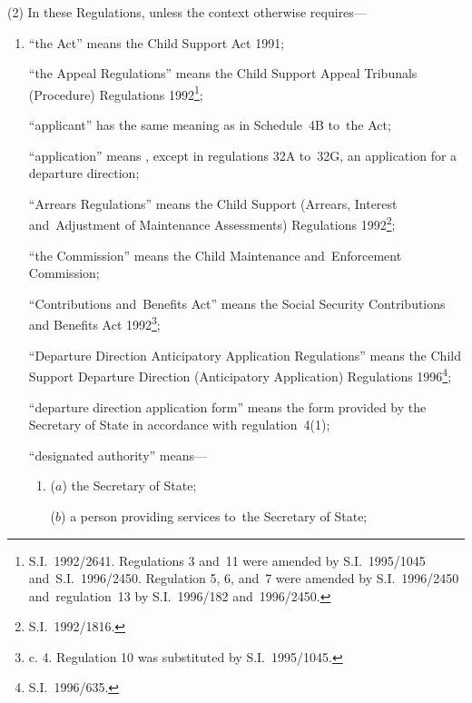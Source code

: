 \documentclass[12pt,a4paper]{article}
\begin{document}
(2) In these Regulations, unless the context otherwise requires—
\begin{enumerate}\item[]
“the Act” means the Child Support Act 1991;

“the Appeal Regulations” means the Child Support Appeal Tribunals (Procedure)
Regulations 1992\footnote{\frenchspacing S.I.~1992/2641. Regulations 3 and~11 were amended by S.I.~1995/1045 and~S.I.~1996/2450. Regulation 5, 6, and~7 were amended by S.I.~1996/2450 and~regulation~13 by S.I.~1996/182 and~1996/2450.};

“applicant” has the same meaning as in Schedule~4B to~the Act;

“application” means%
, except in regulations 32A to~32G,  %
an application for a departure direction;

“Arrears Regulations” means the Child Support (Arrears, Interest and~Adjustment
of Maintenance Assessments) Regulations 1992\footnote{\frenchspacing S.I.~1992/1816.};

“the Commission” means the Child Maintenance and~Enforcement Commission;

“Contributions and~Benefits Act” means the Social Security Contributions and
Benefits Act 1992\footnote{ c. 4. Regulation 10 was substituted by S.I.~1995/1045.};

“Departure Direction Anticipatory Application Regulations” means the Child
Support Departure Direction (Anticipatory Application) Regulations 1996\footnote{\frenchspacing S.I.~1996/635.};

“departure direction application form” means the form provided by the Secretary
of State in accordance with regulation~4(1);


“designated authority” means—
\begin{enumerate}\item[]
    ($a$) 
    the Secretary of State;

    ($b$) 
    a person providing services to~the Secretary of State;


\end{enumerate}
\end{enumerate}
\end{document}
